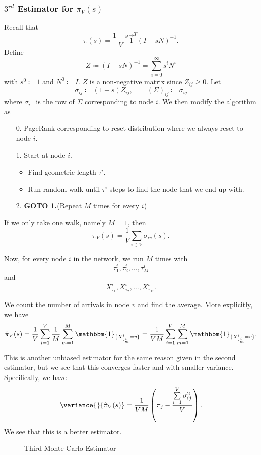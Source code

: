 \subsubsection{\(3^{rd}\) Estimator for \(\pi_V(s)\)}
Recall that
\[
	\pi(s) = \frac{1 - s}{V}\vec{1}^{T} (I - sN)^{-1}.
\]
Define
\[
	Z \coloneqq (I - sN)^{-1} = \sum\limits_{i=0}^{\infty} s^i N^i
\]
with \(s^0\coloneqq 1\) and \(N^0\coloneqq I\). \(Z\) is a non-negative matrix since \(Z_{ij}\geq 0\).
Let
\[
	\sigma_{ij}\coloneqq (1 - s)Z_{ij} , \qquad \left(\Sigma\right)_{ij}\coloneqq \sigma_{ij}
\]
where \(\sigma_{i\cdot}\) is the row of \(\Sigma\) corresponding to node \(i\). We then modify the algorithm as
\begin{enumerate}
	\item[0.] PageRank corresponding to reset distribution where we always reset to node \(i\).
	\item[1.] Start at node \(i\).
		\begin{itemize}
			\item Find geometric length \(\tau^i\).
			\item Run random walk until \(\tau^i\) steps to find the node that we end up with.
		\end{itemize}
	\item[2.] \textbf{GOTO 1.}(Repeat \(M\) times for every \(i\))
\end{enumerate}

If we only take one walk, namely \(M = 1\), then
\[
	\pi_V(s) = \frac{1}{V}\sum\limits_{i\in\mathcal{V}}\sigma_{iv}(s).
\]

Now, for every node \(i\) in the network, we run \(M\) times with
\[
	\tau^i_1, \tau^i_2, \ldots , \tau^i_M
\]
and
\[
	X_{\tau_1}^i, X_{\tau_2}^i, \ldots , X_{\tau_M}^i.
\]

We count the number of arrivals in node \(v\) and find the average. More explicitly, we have
\[
	\hat{\pi}_V(s) = \frac{1}{V}\sum\limits_{i=1}^{V} \frac{1}{M}\sum\limits_{m=1}^{M} \mathbbm{1}_{\{X^i_{\tau^i_m} = v\}} = \frac{1}{VM}\sum\limits_{i=1}^{V} \sum\limits_{m=1}^{M} \mathbbm{1}_{\{X^i_{\tau^i_m} = v\}} .
\]

This is another unbiased estimator for the same reason given in the second estimator, but we see that this converges faster and with smaller variance. Specifically, we have
\[
	\variance{}{\hat{\pi}_V(s)} = \frac{1}{VM}\left(\pi_{j} - \frac{\sum\limits_{i=1}^{V} \sigma_{ij}^2}{V}\right).
\]
We see that this is a better estimator.

\begin{figure}[H]
	\centering
	\caption{Third Monte Carlo Estimator}
	\label{fig:Monte-Carlo-Estimator-3}
\end{figure}